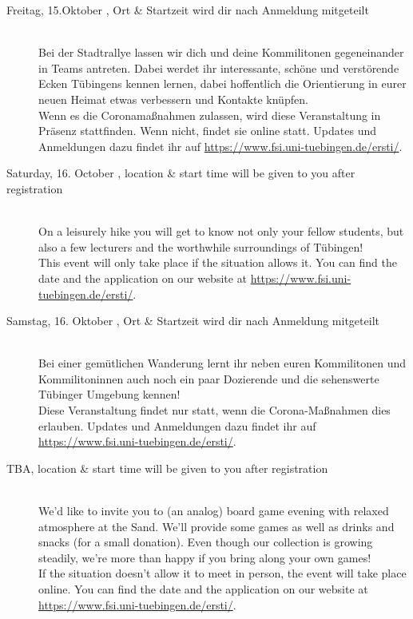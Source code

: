 \begin{description}
\else
	 \item[Freitag, 15.Oktober \YEAR,  \footnotesize{Ort \& Startzeit wird dir nach Anmeldung mitgeteilt}]\ \\
	 Bei der Stadtrallye lassen wir dich und deine Kommilitonen gegeneinander in Teams antreten. Dabei werdet ihr interessante, schöne und verstörende Ecken Tübingens kennen lernen, dabei hoffentlich die Orientierung in eurer neuen Heimat etwas verbessern und Kontakte knüpfen.\\
	Wenn es die Coronamaßnahmen zulassen, wird diese Veranstaltung in Präsenz stattfinden. Wenn nicht, findet sie online statt. Updates und Anmeldungen dazu findet ihr auf \url{https://www.fsi.uni-tuebingen.de/ersti/}.
\fi

\ifml
    \item[Saturday, 16. October \YEAR, \footnotesize{location \& start time will be given to you after registration} ]\ \\
        On a leisurely hike you will get to know not only your fellow students, but also a few lecturers and the worthwhile surroundings of Tübingen! \\
        This event will only take place if the situation allows it. You can find the date and the application on our website at \url{https://www.fsi.uni-tuebingen.de/ersti/}.
\else
    \item[Samstag, 16. Oktober \YEAR, \footnotesize{Ort \& Startzeit wird dir nach Anmeldung mitgeteilt}]\ \\
        Bei einer gemütlichen Wanderung lernt ihr neben euren Kommilitonen und Kommilitoninnen auch noch ein paar Dozierende und die sehenswerte Tübinger Umgebung kennen!\\ 
        Diese Veranstaltung findet nur statt, wenn die Corona-Maßnahmen dies erlauben. Updates und Anmeldungen dazu findet ihr auf \url{https://www.fsi.uni-tuebingen.de/ersti/}.
\fi



\ifml
	\item[TBA, \footnotesize{location \& start time will be given to you after registration} ]\ \\
	We'd like to invite you to (an analog) board game evening with relaxed atmosphere at the Sand. We'll provide some games as well as drinks and snacks (for a small donation). Even though our collection is growing steadily, we're more than happy if you bring along your own games! \\
	If the situation doesn't allow it to meet in person, the event will take place online. You can find the date and the application on our website at \url{https://www.fsi.uni-tuebingen.de/ersti/}.


\end{description}
